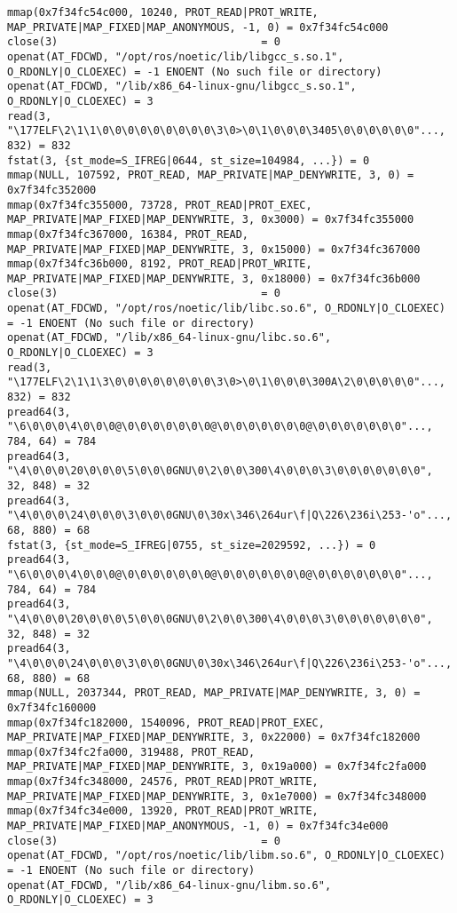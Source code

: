 \documentclass[a4paper, 12pt]{article}
\begin{document}
\begin{lstlisting}
mmap(0x7f34fc54c000, 10240, PROT_READ|PROT_WRITE, MAP_PRIVATE|MAP_FIXED|MAP_ANONYMOUS, -1, 0) = 0x7f34fc54c000
close(3)                                = 0
openat(AT_FDCWD, "/opt/ros/noetic/lib/libgcc_s.so.1", O_RDONLY|O_CLOEXEC) = -1 ENOENT (No such file or directory)
openat(AT_FDCWD, "/lib/x86_64-linux-gnu/libgcc_s.so.1", O_RDONLY|O_CLOEXEC) = 3
read(3, "\177ELF\2\1\1\0\0\0\0\0\0\0\0\0\3\0>\0\1\0\0\0\3405\0\0\0\0\0\0"..., 832) = 832
fstat(3, {st_mode=S_IFREG|0644, st_size=104984, ...}) = 0
mmap(NULL, 107592, PROT_READ, MAP_PRIVATE|MAP_DENYWRITE, 3, 0) = 0x7f34fc352000
mmap(0x7f34fc355000, 73728, PROT_READ|PROT_EXEC, MAP_PRIVATE|MAP_FIXED|MAP_DENYWRITE, 3, 0x3000) = 0x7f34fc355000
mmap(0x7f34fc367000, 16384, PROT_READ, MAP_PRIVATE|MAP_FIXED|MAP_DENYWRITE, 3, 0x15000) = 0x7f34fc367000
mmap(0x7f34fc36b000, 8192, PROT_READ|PROT_WRITE, MAP_PRIVATE|MAP_FIXED|MAP_DENYWRITE, 3, 0x18000) = 0x7f34fc36b000
close(3)                                = 0
openat(AT_FDCWD, "/opt/ros/noetic/lib/libc.so.6", O_RDONLY|O_CLOEXEC) = -1 ENOENT (No such file or directory)
openat(AT_FDCWD, "/lib/x86_64-linux-gnu/libc.so.6", O_RDONLY|O_CLOEXEC) = 3
read(3, "\177ELF\2\1\1\3\0\0\0\0\0\0\0\0\3\0>\0\1\0\0\0\300A\2\0\0\0\0\0"..., 832) = 832
pread64(3, "\6\0\0\0\4\0\0\0@\0\0\0\0\0\0\0@\0\0\0\0\0\0\0@\0\0\0\0\0\0\0"..., 784, 64) = 784
pread64(3, "\4\0\0\0\20\0\0\0\5\0\0\0GNU\0\2\0\0\300\4\0\0\0\3\0\0\0\0\0\0\0", 32, 848) = 32
pread64(3, "\4\0\0\0\24\0\0\0\3\0\0\0GNU\0\30x\346\264ur\f|Q\226\236i\253-'o"..., 68, 880) = 68
fstat(3, {st_mode=S_IFREG|0755, st_size=2029592, ...}) = 0
pread64(3, "\6\0\0\0\4\0\0\0@\0\0\0\0\0\0\0@\0\0\0\0\0\0\0@\0\0\0\0\0\0\0"..., 784, 64) = 784
pread64(3, "\4\0\0\0\20\0\0\0\5\0\0\0GNU\0\2\0\0\300\4\0\0\0\3\0\0\0\0\0\0\0", 32, 848) = 32
pread64(3, "\4\0\0\0\24\0\0\0\3\0\0\0GNU\0\30x\346\264ur\f|Q\226\236i\253-'o"..., 68, 880) = 68
mmap(NULL, 2037344, PROT_READ, MAP_PRIVATE|MAP_DENYWRITE, 3, 0) = 0x7f34fc160000
mmap(0x7f34fc182000, 1540096, PROT_READ|PROT_EXEC, MAP_PRIVATE|MAP_FIXED|MAP_DENYWRITE, 3, 0x22000) = 0x7f34fc182000
mmap(0x7f34fc2fa000, 319488, PROT_READ, MAP_PRIVATE|MAP_FIXED|MAP_DENYWRITE, 3, 0x19a000) = 0x7f34fc2fa000
mmap(0x7f34fc348000, 24576, PROT_READ|PROT_WRITE, MAP_PRIVATE|MAP_FIXED|MAP_DENYWRITE, 3, 0x1e7000) = 0x7f34fc348000
mmap(0x7f34fc34e000, 13920, PROT_READ|PROT_WRITE, MAP_PRIVATE|MAP_FIXED|MAP_ANONYMOUS, -1, 0) = 0x7f34fc34e000
close(3)                                = 0
openat(AT_FDCWD, "/opt/ros/noetic/lib/libm.so.6", O_RDONLY|O_CLOEXEC) = -1 ENOENT (No such file or directory)
openat(AT_FDCWD, "/lib/x86_64-linux-gnu/libm.so.6", O_RDONLY|O_CLOEXEC) = 3

\end{lstlisting}
\end{document}
